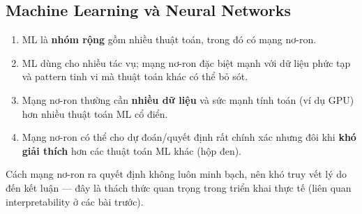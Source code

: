 \subsection{Machine Learning và Neural Networks}

\begin{ynghia}[title={Bốn điểm so sánh chính}]
\begin{enumerate}
  \item ML là \textbf{nhóm rộng} gồm nhiều thuật toán, trong đó có mạng nơ-ron.
  \item ML dùng cho nhiều tác vụ; mạng nơ-ron đặc biệt mạnh với dữ liệu phức tạp và pattern tinh vi mà thuật toán khác có thể bỏ sót.
  \item Mạng nơ-ron thường cần \textbf{nhiều dữ liệu} và sức mạnh tính toán (ví dụ GPU) hơn nhiều thuật toán ML cổ điển.
  \item Mạng nơ-ron có thể cho dự đoán/quyết định rất chính xác nhưng đôi khi \textbf{khó giải thích} hơn các thuật toán ML khác (hộp đen).
\end{enumerate}
\end{ynghia}

\begin{luuy}[title={Giải thích mô hình}]
Cách mạng nơ-ron ra quyết định không luôn minh bạch, nên khó truy vết lý do đến kết luận --- đây là thách thức quan trọng trong triển khai thực tế (liên quan interpretability ở các bài trước).
\end{luuy}
